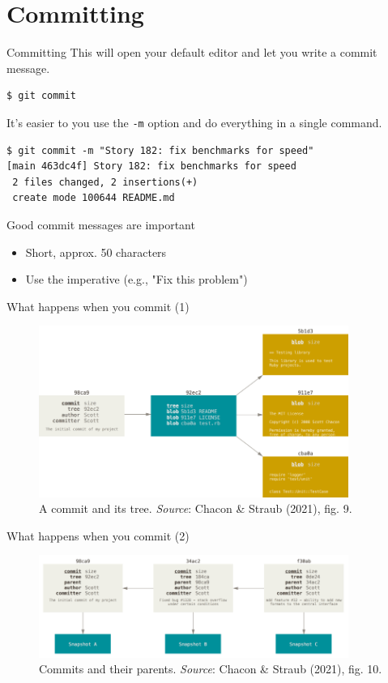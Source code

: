 \documentclass[handout]{beamer}
\begin{document}
\section{Committing}

\begin{frame}[fragile]{Committing}
This will open your default editor and let you write a commit message.
\begin{lstlisting}
$ git commit
\end{lstlisting}
It's easier to you use the \texttt{-m} option and do everything in a single command.
\begin{lstlisting}
$ git commit -m "Story 182: fix benchmarks for speed"
[main 463dc4f] Story 182: fix benchmarks for speed
 2 files changed, 2 insertions(+)
 create mode 100644 README.md
\end{lstlisting}
Good commit messages are important
\begin{itemize}
	\item Short, approx. 50 characters
	\item Use the imperative (e.g., "Fix this problem")
\end{itemize}
\end{frame}

\begin{frame}{What happens when you commit (1)}
	\begin{figure}
		\includegraphics[width=0.9\textwidth]{figures/fig09_commit.png}
		\caption{A commit and its tree. \textit{Source}: Chacon \& Straub (2021), fig. 9.}
	\end{figure}
\end{frame}

\begin{frame}{What happens when you commit (2)}
	\begin{figure}
		\includegraphics[width=0.9\textwidth]{figures/fig10_commits_parents.png}
		\caption{Commits and their parents. \textit{Source}: Chacon \& Straub (2021), fig. 10.}
	\end{figure}
\end{frame}
\end{document}
